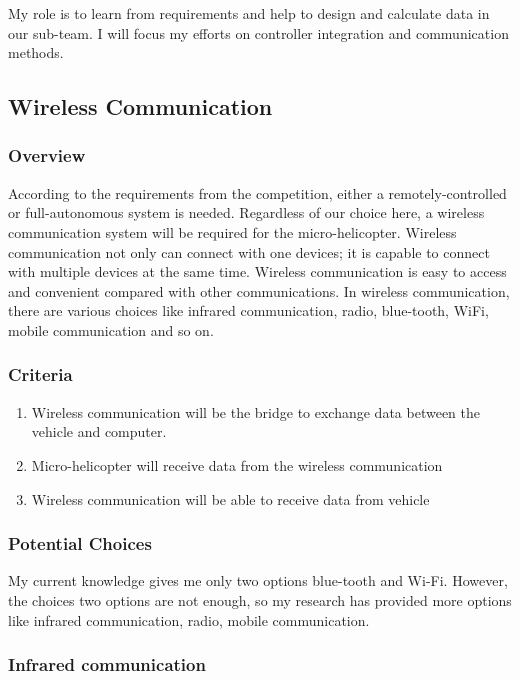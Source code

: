 \documentclass[onecolumn, draftclsnofoot,10pt, compsoc]{IEEEtran}
\begin{document}
My role is to learn from requirements and help to design and calculate data in our sub-team. I will focus my efforts on controller integration and communication methods.

\subsection{Wireless Communication}
\subsubsection{Overview}

According to the requirements from the competition, either a remotely-controlled or full-autonomous system is needed. Regardless of our choice here, a wireless communication system will be required for the micro-helicopter. Wireless communication not only can connect with one devices; it is capable to connect with multiple devices at the same time.  Wireless communication is easy to access and convenient compared with other communications. In wireless communication, there are various choices like infrared communication, radio, blue-tooth, WiFi, mobile communication and so on.

\subsubsection{Criteria}
\begin{enumerate}
\item{Wireless communication will be the bridge to exchange data between the vehicle and computer.}
\item{Micro-helicopter will receive data from the wireless communication}
\item{Wireless communication will be able to receive data from vehicle}
\end{enumerate}

\subsubsection{Potential Choices}

My current knowledge gives me only two options blue-tooth and Wi-Fi. However, the choices two options are not enough, so my research has provided more options like infrared communication, radio, mobile communication.

\subsubsection{Infrared communication}
\end{document}
